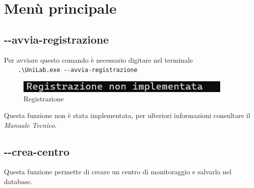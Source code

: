 \documentclass[12pt]{scrreprt}
\begin{document}
	\section{Menù principale}
	
		\subsection{-$ $-avvia-registrazione}
	
		Per avviare questo comando \`e necessario digitare nel terminale\\
		\verb!    .\UniLab.exe --avvia-registrazione!\\
		\begin{figure}[H]
			\centering
			\includegraphics[width=0.5\linewidth]{Screen/registrazione}
			\caption{Registrazione}
			\label{fig:registrazione (non implementata)}
		\end{figure}
			Questa funzione non \`e stata implementata, per ulteriori informazioni consultare il \textsl{Manuale Tecnico}. 
		
		\subsection{-$ $-crea-centro}
		Questa funzione permette di creare un centro di monitoraggio e salvarlo nel database.
		
\end{document}
